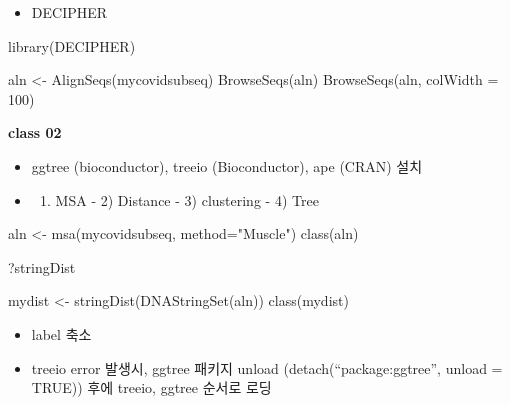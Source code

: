 \documentclass[
]{book}
\newenvironment{Shaded}{\begin{snugshade}}{\end{snugshade}}
\newcommand{\AttributeTok}[1]{\textcolor[rgb]{0.77,0.63,0.00}{#1}}
\newcommand{\DecValTok}[1]{\textcolor[rgb]{0.00,0.00,0.81}{#1}}
\newcommand{\FunctionTok}[1]{\textcolor[rgb]{0.00,0.00,0.00}{#1}}
\newcommand{\NormalTok}[1]{#1}
\newcommand{\OtherTok}[1]{\textcolor[rgb]{0.56,0.35,0.01}{#1}}
\newcommand{\StringTok}[1]{\textcolor[rgb]{0.31,0.60,0.02}{#1}}
\providecommand{\tightlist}{%
  \setlength{\itemsep}{0pt}\setlength{\parskip}{0pt}}
\begin{document}
\begin{itemize}
\tightlist
\item
  DECIPHER
\end{itemize}

\begin{Shaded}
\begin{Highlighting}[]
\FunctionTok{library}\NormalTok{(DECIPHER)}

\NormalTok{aln }\OtherTok{\textless{}{-}} \FunctionTok{AlignSeqs}\NormalTok{(mycovidsubseq)}
\FunctionTok{BrowseSeqs}\NormalTok{(aln)}
\FunctionTok{BrowseSeqs}\NormalTok{(aln, }\AttributeTok{colWidth =} \DecValTok{100}\NormalTok{)}
\end{Highlighting}
\end{Shaded}

\textbf{class 02}

\begin{itemize}
\item
  ggtree (bioconductor), treeio (Bioconductor), ape (CRAN) 설치
\item
  \begin{enumerate}
  \def\labelenumi{\arabic{enumi})}
  \tightlist
  \item
    MSA - 2) Distance - 3) clustering - 4) Tree
  \end{enumerate}
\end{itemize}

\begin{Shaded}
\begin{Highlighting}[]

\NormalTok{aln }\OtherTok{\textless{}{-}} \FunctionTok{msa}\NormalTok{(mycovidsubseq, }\AttributeTok{method=}\StringTok{"Muscle"}\NormalTok{)}
\FunctionTok{class}\NormalTok{(aln)}

\NormalTok{?stringDist}

\NormalTok{mydist }\OtherTok{\textless{}{-}} \FunctionTok{stringDist}\NormalTok{(}\FunctionTok{DNAStringSet}\NormalTok{(aln))}
\FunctionTok{class}\NormalTok{(mydist)}
\end{Highlighting}
\end{Shaded}

\begin{itemize}
\tightlist
\item
  label 축소
\item
  treeio error 발생시, ggtree 패키지 unload (detach(``package:ggtree'', unload = TRUE)) 후에 treeio, ggtree 순서로 로딩
\end{itemize}
\end{document}
